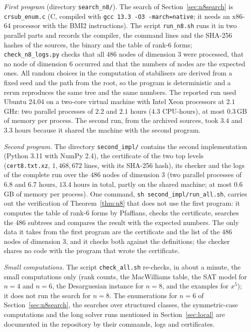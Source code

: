 \documentclass[11pt]{article}
\theoremstyle{definition}
\begin{document}
\emph{First program} (directory \texttt{search\_n8/}). The search of
Section~\ref{sec:n8search} is \texttt{crsub\_enum.c} (C,
compiled with \texttt{gcc 13.3 -O3 -march=native}; it needs an x86-64 processor with the BMI2
instructions). The script \texttt{run\_n8.sh} runs it in two parallel parts and records the
compiler, the command lines and the SHA-256 hashes of the sources, the binary and the table of
rank-$6$ forms; \texttt{check\_n8\_logs.py} checks that all $486$ nodes of dimension $3$ were
processed, that no node of dimension $6$ occurred and that the numbers of nodes are the expected
ones. All random choices in the computation of stabilisers are derived from a fixed seed and the
path from the root, so the program is deterministic and a rerun reproduces the same tree and the
same numbers. The reported run used Ubuntu 24.04 on a two-core virtual machine with Intel Xeon
processors at $2.1$\,GHz: two parallel processes of $2.2$ and $2.1$ hours ($4.3$ CPU-hours), at
most $0.3$\,GB of memory per process. The second run, from the archived sources, took $3.4$ and
$3.3$ hours because it shared the machine with the second program.

\emph{Second program.} The directory \texttt{second\_impl/} contains the second implementation
(Python 3.11 with NumPy 2.4), the certificate of the two top levels (\texttt{cert8.txt.xz},
$1{,}468{,}672$ lines, with its SHA-256 hash), its checker and the logs of the complete run over
the $486$ nodes of dimension $3$ (two parallel processes of $6.8$ and $6.7$ hours, $13.4$ hours
in total, partly on the shared machine; at most $0.6$\,GB of memory per process). One command,
\texttt{sh second\_impl/run\_all.sh}, carries out the verification of Theorem~\ref{thm:n8} that
does not use the first program: it computes the table of rank-$6$ forms by Pfaffians, checks the
certificate, searches the $486$ subtrees and compares the result with the expected numbers. The
only data it takes from the first program are the certificate and the list of the $486$ nodes of
dimension $3$, and it checks both against the definitions; the checker shares no code with the
program that wrote the certificate.

\emph{Small computations.} The script \texttt{check\_all.sh} re-checks, in about a minute, the
small computations only (rank counts, the MacWilliams table, the SAT model for $n=4$ and $n=6$,
the Desarguesian instance for $n=8$, and the examples for $x^5$); it does not run the search for
$n=8$. The enumerations for $n=6$ of Section~\ref{sec:n8search}, the searches over structured
classes, the symmetric-case computations and the long solver runs mentioned in
Section~\ref{sec:local} are documented in the repository by their commands, logs and
certificates.
\end{document}
